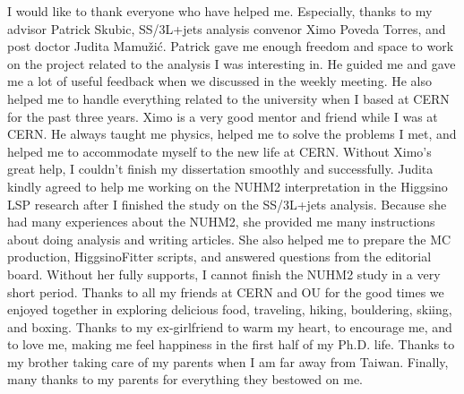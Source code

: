 I would like to thank everyone who have helped me.
%
Especially, thanks to my advisor Patrick Skubic, SS/3L+jets analysis convenor Ximo Poveda Torres, and post doctor Judita Mamu\v{z}i\'{c}.
%
Patrick gave me enough freedom and space to work on the project related to the analysis I was interesting in.
He guided me and gave me a lot of useful feedback when we discussed in the weekly meeting.
He also helped me to handle everything related to the university when I based at CERN for the past three years.
%
Ximo is a very good mentor and friend while I was at CERN.
He always taught me physics, helped me to solve the problems I met, and helped me to accommodate myself to the new life at CERN.
Without Ximo's great help, I couldn't finish my dissertation smoothly and successfully.
%
Judita kindly agreed to help me working on the NUHM2 interpretation in the Higgsino LSP research after I finished the study on the SS/3L+jets analysis.
Because she had many experiences about the NUHM2, she provided me many instructions about doing analysis and writing articles.
She also helped me to prepare the MC production, HiggsinoFitter scripts, and answered questions from the editorial board.
Without her fully supports, I cannot finish the NUHM2 study in a very short period.
%
Thanks to all my friends at CERN and OU for the good times we enjoyed together in exploring delicious food, traveling, hiking, bouldering, skiing, and boxing.
Thanks to my ex-girlfriend to warm my heart, to encourage me, and to love me, making me feel happiness in the first half of my Ph.D. life.
Thanks to my brother taking care of my parents when I am far away from Taiwan.
Finally, many thanks to my parents for everything they bestowed on me.



